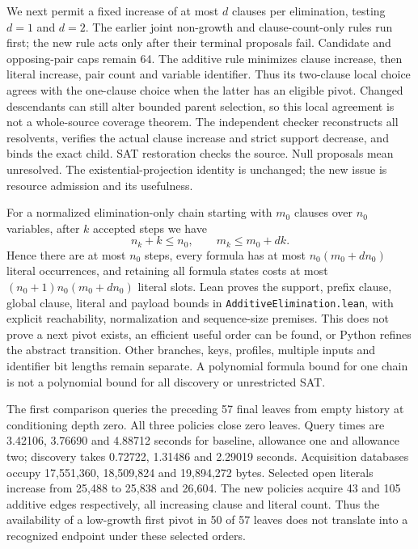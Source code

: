 \documentclass[11pt,a4paper]{article}
\numberwithin{equation}{section}
\theoremstyle{plain}
\theoremstyle{definition}
\theoremstyle{remark}
\begin{document}
We next permit a fixed increase of at most $d$ clauses per elimination, testing $d=1$ and $d=2$. The earlier joint non-growth and clause-count-only rules run first; the new rule acts only after their terminal proposals fail. Candidate and opposing-pair caps remain 64. The additive rule minimizes clause increase, then literal increase, pair count and variable identifier. Thus its two-clause local choice agrees with the one-clause choice when the latter has an eligible pivot. Changed descendants can still alter bounded parent selection, so this local agreement is not a whole-source coverage theorem. The independent checker reconstructs all resolvents, verifies the actual clause increase and strict support decrease, and binds the exact child. SAT restoration checks the source. Null proposals mean unresolved. The existential-projection identity is unchanged; the new issue is resource admission and its usefulness.

For a normalized elimination-only chain starting with $m_0$ clauses over $n_0$ variables, after $k$ accepted steps we have
\[
 n_k+k\leq n_0,\qquad m_k\leq m_0+dk.
\]
Hence there are at most $n_0$ steps, every formula has at most $n_0(m_0+dn_0)$ literal occurrences, and retaining all formula states costs at most $(n_0+1)n_0(m_0+dn_0)$ literal slots. Lean proves the support, prefix clause, global clause, literal and payload bounds in \texttt{AdditiveElimination.lean}, with explicit reachability, normalization and sequence-size premises. This does not prove a next pivot exists, an efficient useful order can be found, or Python refines the abstract transition. Other branches, keys, profiles, multiple inputs and identifier bit lengths remain separate. A polynomial formula bound for one chain is not a polynomial bound for all discovery or unrestricted SAT.

The first comparison queries the preceding 57 final leaves from empty history at conditioning depth zero. All three policies close zero leaves. Query times are 3.42106, 3.76690 and 4.88712 seconds for baseline, allowance one and allowance two; discovery takes 0.72722, 1.31486 and 2.29019 seconds. Acquisition databases occupy 17,551,360, 18,509,824 and 19,894,272 bytes. Selected open literals increase from 25,488 to 25,838 and 26,604. The new policies acquire 43 and 105 additive edges respectively, all increasing clause and literal count. Thus the availability of a low-growth first pivot in 50 of 57 leaves does not translate into a recognized endpoint under these selected orders.
\end{document}
